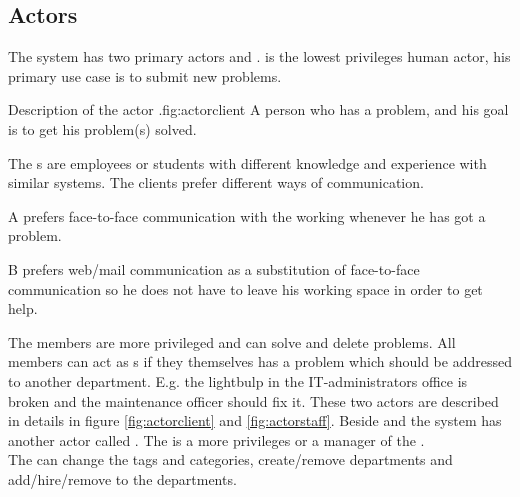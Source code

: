 \subsection{Actors}
\label{sec:actors}


The system has two primary actors \aclient{} and \astaff. \aclient[c] is the lowest privileges human actor, his primary use case is to submit new problems. \\

\begin{sadlist}[h]{\Aclient}{Description of the actor \aclient.}{fig:actorclient}
 A person who has a problem, and his goal is to get his problem(s) solved.

 The \aclient{}s are employees or students with different knowledge and experience with similar systems. The clients prefer different ways of communication.%

 \Aclient{} A prefers face-to-face communication with the working \astaff{} whenever he has got a problem. 

\aclient[c] B prefers web/mail communication as a substitution of face-to-face communication so he does not have to leave his working space in order to get help. 

\end{sadlist}


The \astaff{} members are more privileged and can solve and delete problems. 
All \astaff{} members can act as \aclient{}s if they themselves has a problem which should be addressed to another department. 
E.g. the lightbulp in the IT-administrators office is broken and the maintenance officer should fix it. 
These two actors are described in details in figure \ref{fig:actorclient} and \ref{fig:actorstaff}. 
Beside \astaff{} and \aclient{} the system has another actor called \sadmin{}. 
The \sadmin{} is a more privileges \astaff{} or a manager of the \astaff. \\

The \sadmin{} can change the tags and categories, create/remove departments and add/hire/remove \astaff{} to the departments. 




